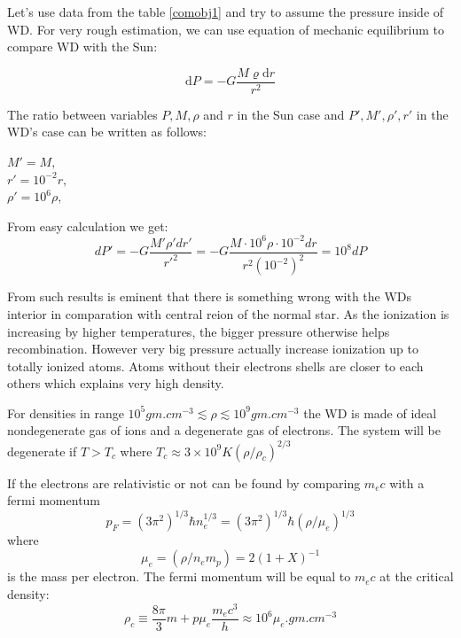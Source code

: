 \documentclass[oneside,a4paper,11pt]{report}
\begin{document}
Let's use data from the table \ref{comobj1} and try to assume the pressure inside of WD. For very 
rough estimation, we can use equation of mechanic equilibrium to compare WD with the Sun:

\begin{equation}
 \mathrm{d}P = -G\frac{M \varrho  \mathrm{d}r}{r^2}
\end{equation}

The ratio between variables $P, M, \rho$ and $r$ in the Sun case and $P', M', \rho', r'$ in the WD's 
case can be written as follows:

\begin{center}
 $M' = M ,$  \\
 $r' = 10^{-2}r,$ \\
 $\rho' = 10^6 \rho,$ \\
\end{center}

From easy calculation we get: 
\begin{equation}
 dP' = -G\frac{M' \rho' dr'}{r'^2} = -G\frac{M \cdot 10^6 \rho \cdot 10^{-2} dr}{r^2 (10^{-2})^2} = 10^{8} dP
\end{equation}

From such results is eminent that there is something wrong with the WDs interior in comparation with central reion of the 
normal star. As the ionization is increasing by higher temperatures, the bigger pressure otherwise helps recombination. However 
very big pressure actually increase ionization up to totally ionized atoms. Atoms without their 
electrons shells are closer to each others which explains very high density.

For densities in range $10^5 gm.cm^{-3} \lesssim \rho \lesssim 10^9 gm.cm^{-3}$ the WD is made 
of ideal nondegenerate gas of ions and a degenerate gas of electrons. The system will be degenerate 
if $T>T_c$ where $T_c \approx 3 \times 10^9 K (\rho / \rho_c)^{2/3} $ 

If the electrons are relativistic or not can be found by comparing $m_e c$ with a fermi momentum
\begin{equation}
 p_F = (3\pi^2)^{1/3}\hbar n_e^{1/3} = (3\pi^2)^{1/3}\hbar (\rho/\mu_e)^{1/3}
\end{equation}
 where 
\begin{equation}
 \mu_e = (\rho / n_e m_p) = 2(1+X)^{-1}
\end{equation}
is the mass per electron. The fermi momentum will be equal to $m_e c$ at the critical density:
\begin{equation}
\rho_c \equiv \frac{8\pi}{3}m+p \mu_e \frac{m_ec^3}{h} \approx 10^6 \mu_e.gm.cm^{-3}
\end{equation}
\end{document}
